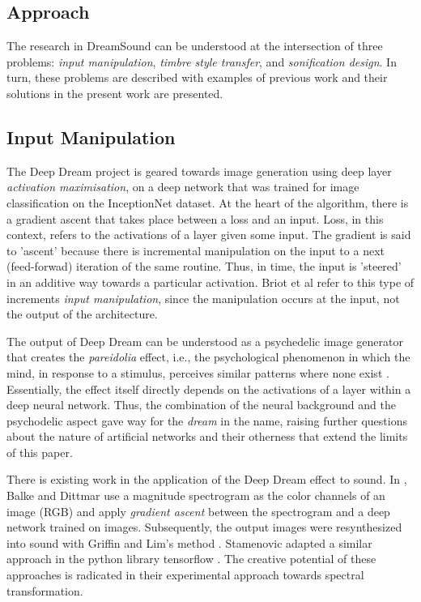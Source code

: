 \documentclass[a4paper,10pt,oneside]{article}
\begin{document}
\begin{sloppy}
\section{Approach}

The research in DreamSound can be understood at the intersection of three problems: \textit{input manipulation}, \textit{timbre style transfer}, and \textit{sonification design}. In turn, these problems are described with examples of previous work and their solutions in the present work are presented.


\subsection{Input Manipulation}
The Deep Dream project \cite{Mordvintsev2015} is geared towards image generation using deep layer \textit{activation maximisation}, on a deep network that was trained for image classification on the InceptionNet \cite{szegedy2014going} dataset. At the heart of the algorithm, there is a gradient ascent that takes place between a loss and an input. Loss, in this context, refers to the activations of a layer given some input. The gradient is said to 'ascent' because there is incremental manipulation on the input to a next (feed-forwad) iteration of the same routine. Thus, in time, the input is 'steered' in an additive way towards a particular activation. Briot et al \cite{Briot2017} refer to this type of increments \textit{input manipulation}, since the manipulation occurs at the input, not the output of the architecture.

The output of Deep Dream can be understood as a psychedelic image generator that creates the \textit{pareidolia} effect, i.e., the psychological phenomenon in which the mind, in response to a stimulus, perceives similar patterns where none exist \cite{Briot2017}. Essentially, the effect itself directly depends on the activations of a layer within a deep neural network. Thus, the combination of the neural background and the psychodelic aspect gave way for the \textit{dream} in the name, raising further questions about the nature of artificial networks and their otherness that extend the limits of this paper.

There is existing work in the application of the Deep Dream effect \cite{Mordvintsev2015} to sound. In \cite{Balke2015}, Balke and Dittmar use a magnitude spectrogram as the color channels of an image (RGB) and apply \textit{gradient ascent} between the spectrogram and a deep network trained on images. Subsequently, the output images were resynthesized into sound with Griffin and Lim's method \cite{Lim1983}. Stamenovic adapted a similar approach in the python library tensorflow \cite{Stamenovic2016}. The creative potential of these approaches is radicated in their experimental approach towards spectral transformation. 


\end{sloppy}
\end{document}
